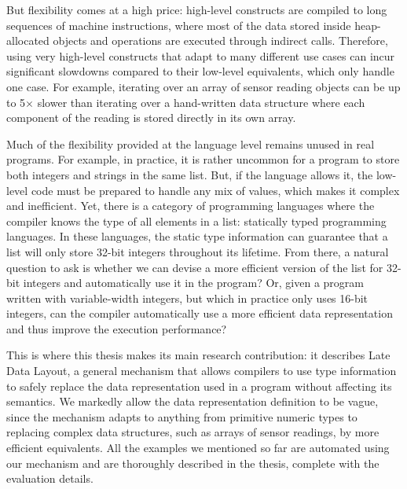 But flexibility comes at a high price: high-level constructs are compiled to long sequences of machine instructions, where most of the data stored inside heap-allocated objects and operations are executed through indirect calls. Therefore, using very high-level constructs that adapt to many different use cases can incur significant slowdowns compared to their low-level equivalents, which only handle one case. For example, iterating over an array of sensor reading objects can be up to 5$\times$ slower than iterating over a hand-written data structure where each component of the reading is stored directly in its own array.

Much of the flexibility provided at the language level remains unused in real programs. For example, in practice, it is rather uncommon for a program to store both integers and strings in the same list. But, if the language allows it, the low-level code must be prepared to handle any mix of values, which makes it complex and inefficient. Yet, there is a category of programming languages where the compiler knows the type of all elements in a list: statically typed programming languages. In these languages, the static type information can guarantee that a list will only store 32-bit integers throughout its lifetime. From there, a natural question to ask is whether we can devise a more efficient version of the list for 32-bit integers and automatically use it in the program? Or, given a program written with variable-width integers, but which in practice only uses 16-bit integers, can the compiler automatically use a more efficient data representation and thus improve the execution performance?

This is where this thesis makes its main research contribution: it describes Late Data Layout, a general mechanism that allows compilers to use type information to safely replace the data representation used in a program without affecting its semantics. We markedly allow the data representation definition to be vague, since the mechanism adapts to anything from primitive numeric types to replacing complex data structures, such as arrays of sensor readings, by more efficient equivalents. All the examples we mentioned so far are automated using our mechanism and are thoroughly described in the thesis, complete with the evaluation details. %

